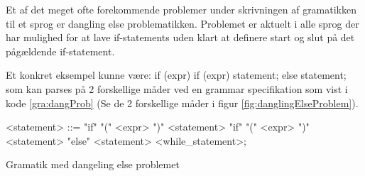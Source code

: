 


\label{subsec:danglingelse}
Et af det meget ofte forekommende problemer under skrivningen af gramatikken til et sprog er dangling else problematikken. Problemet er aktuelt i alle sprog der har mulighed for at lave if-statements uden klart at definere start og slut på det pågældende if-statement.

Et konkret eksempel kunne være: if (expr) if (expr) statement; else statement; som kan parses på 2 forskellige måder ved en grammar specifikation som vist i kode \ref{gra:dangProb} (Se de 2 forskellige måder i figur \ref{fig:danglingElseProblem}).

\begin{Grammar}
 \begin{grammar}
    <statement> ::= "if" "(" <expr> ")" <statement> 
    \alt "if" "(" <expr> ")" <statement> "else" <statement>
    \alt <while\_statement>;
 \end{grammar}
 \caption{Gramatik med dangeling else problemet}\label{gra:dangProb}
\end{Grammar}


